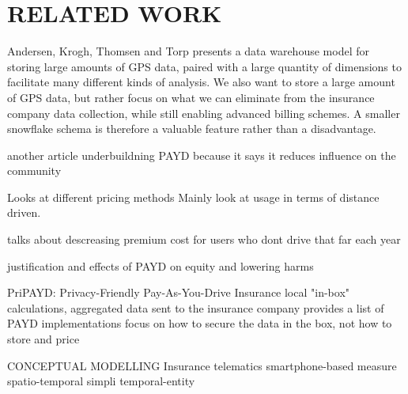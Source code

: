 \section{RELATED WORK}\label{sec:relwork}
Andersen, Krogh, Thomsen and Torp presents a data warehouse model for storing large amounts of GPS data, paired with a large quantity of dimensions to facilitate many different kinds of analysis\cite{art:gpswarehouse}. We also want to store a large amount of GPS data, but rather focus on what we can eliminate from the insurance company data collection, while still enabling advanced billing schemes. A smaller snowflake schema is therefore a valuable feature rather than a disadvantage.




another article underbuildning PAYD because it says it reduces influence on the community
\cite{art:vehicfeacosben}

Looks at different pricing methods
Mainly look at usage in terms of distance driven.
\cite{art:PAYDVehInsur}

talks about descreasing premium cost for users who dont drive that far each year
\cite{art:PAYDafford}

justification and effects of PAYD on equity and lowering harms
\cite{art:PAYDredharms}





PriPAYD: Privacy-Friendly
Pay-As-You-Drive Insurance
local "in-box" calculations, aggregated data sent to the insurance company
provides a list of PAYD implementations
focus on how to secure the data in the box, not how to store and price
\citep{art:PriPAYDprivacy}

CONCEPTUAL MODELLING
Insurance telematics
smartphone-based measure
spatio-temporal simpli
temporal-entity